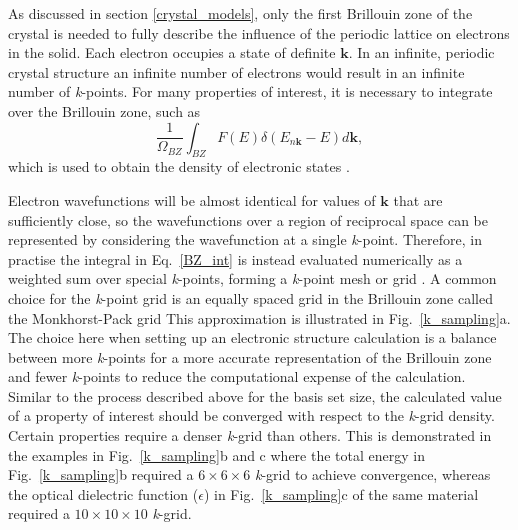 \documentclass[11pt, twoside]{report}
\begin{document}
As discussed in section \ref{crystal_models}, only the first Brillouin zone of the crystal is needed to fully describe the influence of the periodic lattice on electrons in the solid.
Each electron occupies a state of definite $\mathbf{k}$. In an infinite, periodic crystal structure an infinite number of electrons would result in an infinite number of \textit{k}-points. For many properties of interest, it is necessary to integrate over the Brillouin zone, such as 
\begin{equation}\label{BZ_int}
\frac{1}{\Omega_{BZ}} \int_{BZ} F(E)\delta(E_{n\boldsymbol{k}}-E)d\boldsymbol{k},    
\end{equation}
which is used to obtain the density of electronic states \cite{vasp_k-sampling_slides}.

Electron wavefunctions will be almost identical for values of $\boldsymbol{k}$ that are sufficiently close, so the wavefunctions over a region of reciprocal space can be represented by considering the wavefunction at a single \textit{k}-point. Therefore, in practise the integral in Eq.~\ref{BZ_int} is instead evaluated numerically as a weighted sum over special \textit{k}-points, forming a \textit{k}-point mesh or grid \cite{vasp_k-sampling_slides}. A common choice for the \textit{k}-point grid is an equally spaced grid in the Brillouin zone called the Monkhorst-Pack grid \cite{MonkhorstPack}
This approximation is illustrated in Fig.~\ref{k_sampling}a. The choice here when setting up an electronic structure calculation is a balance between more \textit{k}-points for a more accurate representation of the Brillouin zone and fewer \textit{k}-points to reduce the computational expense of the calculation. Similar to the process described above for the basis set size, the calculated value of a property of interest should be converged with respect to the \textit{k}-grid density. Certain properties require a denser \textit{k}-grid than others. This is demonstrated in the examples in Fig.~\ref{k_sampling}b and c where the total energy in Fig.~\ref{k_sampling}b required a $6\times6\times6$ \textit{k}-grid to achieve convergence, whereas the optical dielectric function ($\epsilon$) in Fig.~\ref{k_sampling}c of the same material required a $10\times10\times10$ \textit{k}-grid.
\end{document}
